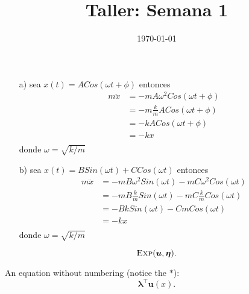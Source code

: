 \documentclass[a4paper]{article}
\date{\today}
\title{Taller: Semana 1}
\newcommand{\T}{\top}
\newcommand{\expdist}[2]{%
        \normalfont{\textsc{Exp}}(#1, #2)%
    }
\newcommand{\expparam}{\bm \lambda}
\newcommand{\natparam}{\bm \eta}
\newcommand{\sufstat}{\bm u}
\begin{document}
    \header{}

    \begin{answer}[Problema 1.]
    \begin{enumerate}
        \item [a)] sea $x(t) = ACos(\omega t + \phi)$ entonces
        \begin{equation*}
        \begin{split}
             m \ddot{x} &= -mA\omega^2 Cos(\omega t + \phi)\\
            &=  -m\frac{k}{m}A Cos(\omega t + \phi)\\
            &=  -k A Cos(\omega t + \phi)\\
             &=  -kx\\
        \end{split}
        \end{equation*}
            donde $\omega = \sqrt{k/m}$
              \item [b)] sea $x(t) = BSin(\omega t) + CCos(\omega t)$ entonces
        \begin{equation*}
        \begin{split}
             m \ddot{x} &= -mB\omega^2Sin(\omega t) - mC\omega^2Cos(\omega t)\\
            &= -mB\frac{k}{m}Sin(\omega t) - mC\frac{k}{m}Cos(\omega t)\\
            &= -BkSin(\omega t) - CmCos(\omega t)\\
             &=  -kx\\
        \end{split}
        \end{equation*}
            donde $\omega = \sqrt{k/m}$
            
            
    \end{enumerate}
    
    
    
    
    
    
    

        \begin{equation}
            \expdist{\sufstat}{\natparam}.
        \end{equation}

        An equation without numbering (notice the $*$):
        \begin{equation*}
            \expparam^{\T} \sufstat(x).
        \end{equation*}
    \end{answer}
    
\end{document}
